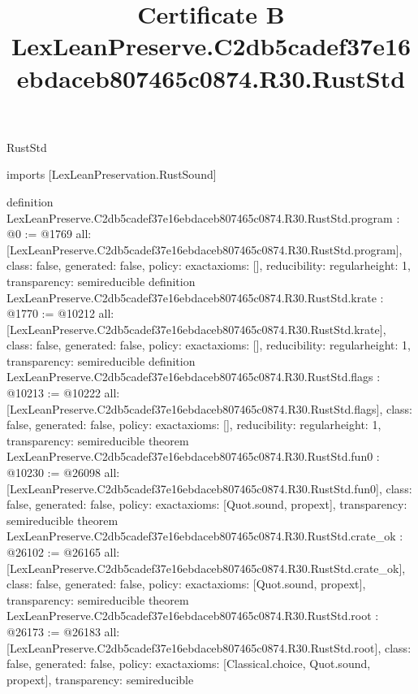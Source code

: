 \begin{lexlean}{RustStd}
\title{Certificate B LexLeanPreserve.C2db5cadef37e16ebdaceb807465c0874.R30.RustStd}
\begin{coremodule}
imports [LexLeanPreservation.RustSound]

definition LexLeanPreserve.C2db5cadef37e16ebdaceb807465c0874.R30.RustStd.program : @0 := @1769 {
  all: [LexLeanPreserve.C2db5cadef37e16ebdaceb807465c0874.R30.RustStd.program],
  class: false,
  generated: false,
  policy: exact{axioms: []},
  reducibility: regular{height: 1},
  transparency: semireducible
}
definition LexLeanPreserve.C2db5cadef37e16ebdaceb807465c0874.R30.RustStd.krate : @1770 := @10212 {
  all: [LexLeanPreserve.C2db5cadef37e16ebdaceb807465c0874.R30.RustStd.krate],
  class: false,
  generated: false,
  policy: exact{axioms: []},
  reducibility: regular{height: 1},
  transparency: semireducible
}
definition LexLeanPreserve.C2db5cadef37e16ebdaceb807465c0874.R30.RustStd.flags : @10213 := @10222 {
  all: [LexLeanPreserve.C2db5cadef37e16ebdaceb807465c0874.R30.RustStd.flags],
  class: false,
  generated: false,
  policy: exact{axioms: []},
  reducibility: regular{height: 1},
  transparency: semireducible
}
theorem LexLeanPreserve.C2db5cadef37e16ebdaceb807465c0874.R30.RustStd.fun0 : @10230 := @26098 {
  all: [LexLeanPreserve.C2db5cadef37e16ebdaceb807465c0874.R30.RustStd.fun0],
  class: false,
  generated: false,
  policy: exact{axioms: [Quot.sound, propext]},
  transparency: semireducible
}
theorem LexLeanPreserve.C2db5cadef37e16ebdaceb807465c0874.R30.RustStd.crate_ok : @26102 := @26165 {
  all: [LexLeanPreserve.C2db5cadef37e16ebdaceb807465c0874.R30.RustStd.crate_ok],
  class: false,
  generated: false,
  policy: exact{axioms: [Quot.sound, propext]},
  transparency: semireducible
}
theorem LexLeanPreserve.C2db5cadef37e16ebdaceb807465c0874.R30.RustStd.root : @26173 := @26183 {
  all: [LexLeanPreserve.C2db5cadef37e16ebdaceb807465c0874.R30.RustStd.root],
  class: false,
  generated: false,
  policy: exact{axioms: [Classical.choice, Quot.sound, propext]},
  transparency: semireducible
}


\end{coremodule}
\end{lexlean}
